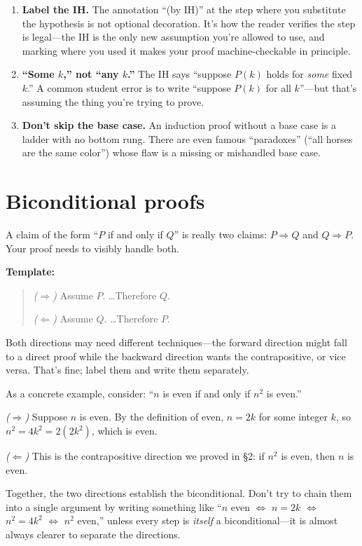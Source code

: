 \documentclass[11pt]{article}
\begin{document}
\begin{enumerate}
  \item \textbf{Label the IH.} The annotation ``(by IH)'' at the step where you substitute the hypothesis is not optional decoration. It's how the reader verifies the step is legal---the IH is the only new assumption you're allowed to use, and marking where you used it makes your proof machine-checkable in principle.
  \item \textbf{``Some $k$,'' not ``any $k$.''} The IH says ``suppose $P(k)$ holds for \emph{some} fixed $k$.'' A common student error is to write ``suppose $P(k)$ for all $k$''---but that's assuming the thing you're trying to prove.
  \item \textbf{Don't skip the base case.} An induction proof without a base case is a ladder with no bottom rung. There are even famous ``paradoxes'' (``all horses are the same color'') whose flaw is a missing or mishandled base case.
\end{enumerate}

\section{Biconditional proofs}

A claim of the form ``$P$ if and only if $Q$'' is really two claims: $P \Rightarrow Q$ and $Q \Rightarrow P$. Your proof needs to visibly handle both.

\medskip
\noindent\textbf{Template:}
\begin{quote}
\emph{($\Rightarrow$)} Assume $P$. \ldots Therefore $Q$.

\smallskip
\emph{($\Leftarrow$)} Assume $Q$. \ldots Therefore $P$.
\end{quote}

Both directions may need different techniques---the forward direction might fall to a direct proof while the backward direction wants the contrapositive, or vice versa. That's fine; label them and write them separately.

As a concrete example, consider: ``$n$ is even if and only if $n^2$ is even.''

\emph{($\Rightarrow$)} Suppose $n$ is even. By the definition of even, $n = 2k$ for some integer $k$, so $n^2 = 4k^2 = 2(2k^2)$, which is even.

\emph{($\Leftarrow$)} This is the contrapositive direction we proved in §2: if $n^2$ is even, then $n$ is even.

Together, the two directions establish the biconditional. Don't try to chain them into a single argument by writing something like ``$n$ even $\Leftrightarrow$ $n = 2k$ $\Leftrightarrow$ $n^2 = 4k^2$ $\Leftrightarrow$ $n^2$ even,'' unless every step is \emph{itself} a biconditional---it is almost always clearer to separate the directions.
\end{document}
